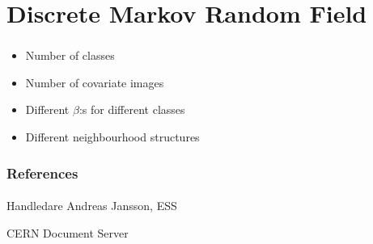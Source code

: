 \documentclass[12pt, english]{beamer}
\begin{document}
\section{Discrete Markov Random Field}
\begin{frame}
  \frametitle{}
  \framesubtitle{}

  \begin{block}{}
  \begin{itemize}
    \item Number of classes
    \item Number of covariate images
    \item Different $\beta$:s for different classes
    \item Different neighbourhood structures
  \end{itemize}
  \end{block}



\end{frame}





\begin{frame}
  \frametitle{References}
  \framesubtitle{}
  \begin{thebibliography}{10}

  \beamertemplatearticlebibitems
  
   Handledare Andreas Jansson, ESS
  
    CERN Document Server


  \end{thebibliography}
\end{frame}

\end{document}
